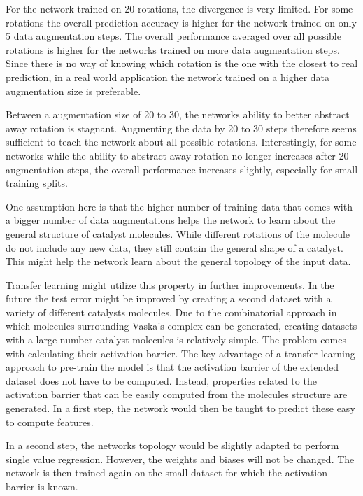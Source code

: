 For the network trained on 20 rotations, the divergence is very limited.
For some rotations the overall prediction accuracy is higher for the network trained on only 5 data augmentation steps.
The overall performance averaged over all possible rotations is higher for the networks trained on more data augmentation steps.
Since there is no way of knowing which rotation is the one with the closest to real prediction, in 
a real world application the network trained on a higher data augmentation size is preferable.

Between a augmentation size of 20 to 30, the networks ability to better abstract away rotation is stagnant.
Augmenting the data by 20 to 30 steps therefore seems sufficient to teach the network about all possible rotations.
Interestingly, for some networks while the ability to abstract away rotation no longer increases after 20 augmentation 
steps, the overall performance increases slightly, especially for small training splits.

One assumption here is that the higher number of training data that comes with a bigger number of data augmentations
helps the network to learn about the general structure of catalyst molecules.
While different rotations of the molecule do not include any new data, they still contain the 
general shape of a catalyst.
This might help the network learn about the general topology of the input data.

Transfer learning might utilize this property in further improvements.
In the future the test error might be improved by creating a second dataset with a variety of different catalysts molecules.
Due to the combinatorial approach in which molecules surrounding Vaska's complex can be generated, 
creating datasets with a large number catalyst molecules is relatively simple.
The problem comes with calculating their activation barrier.
The key advantage of a transfer learning approach to pre-train the model is that the activation barrier of the extended dataset does not have to be computed.
Instead, properties related to the activation barrier that can be easily computed from the molecules structure are generated.
In a first step, the network would then be taught to predict these easy to compute features.

In a second step, the networks topology would be slightly adapted to perform single value regression.
However, the weights and biases will not be changed.
The network is then trained again on the small dataset for which the activation barrier is known.

